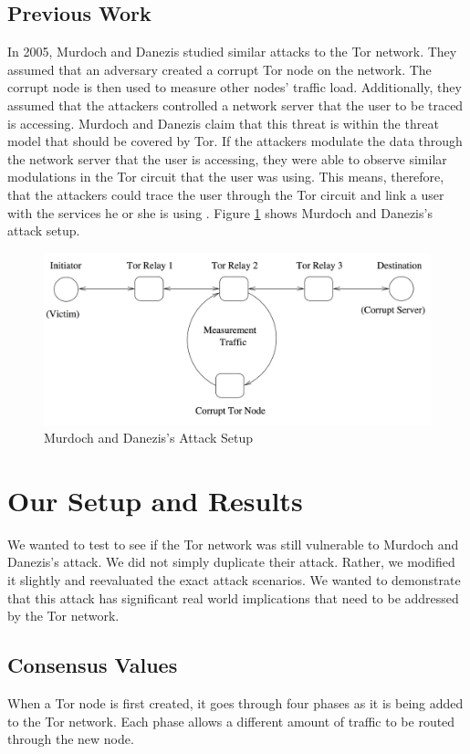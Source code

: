 \documentclass[12pt,journal]{IEEEtran}
\begin{document}
\subsection{Previous Work}
In 2005, Murdoch and Danezis studied similar attacks to the Tor network. They assumed that an adversary created a corrupt Tor node on the network. The corrupt node is then used to measure other nodes' traffic load. Additionally, they assumed that the attackers controlled a network server that the user to be traced is accessing. Murdoch and Danezis claim that this threat is within the threat model that should be covered by Tor. If the attackers modulate the data through the network server that the user is accessing, they were able to observe similar modulations in the Tor circuit that the user was using. This means, therefore, that the attackers could trace the user through the Tor circuit and link a user with the services he or she is using \cite{Murdoch:2005:LTA:1058433.1059390}. Figure \ref{murdochsetup} shows Murdoch and Danezis's attack setup.
\begin{figure}

 \center
  \includegraphics[width=\textwidth]{figures/murdochattacksetup.png}
  \caption{Murdoch and Danezis's Attack Setup}
  \label{murdochsetup}
\end{figure}

\section{Our Setup and Results}
We wanted to test to see if the Tor network was still vulnerable to Murdoch and Danezis's attack. We did not simply duplicate their attack. Rather, we modified it slightly and reevaluated the exact attack scenarios. We wanted to demonstrate that this attack has significant real world implications that need to be addressed by the Tor network.
\subsection{Consensus Values}
When a Tor node is first created, it goes through four phases as it is being added to the Tor network. Each phase allows a different amount of traffic to be routed through the new node.
\end{document}
